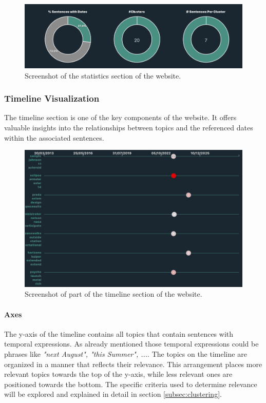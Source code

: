\documentclass[12pt,oneside,bibtotoc,liststotoc]{scrbook}
\begin{document}
\begin{figure}[H]
\centering
\includegraphics[width=13cm]{img/statistics.png}
\caption{Screenshot of the statistics section of the website.}
\label{fig:statistics_website}
\end{figure}


\subsubsection{Timeline Visualization}
 The timeline section is one of the key components of the website. It offers valuable insights into the relationships between topics and the referenced dates within the associated sentences.

\begin{figure}[H]
\centering
\includegraphics[width=13cm]{img/timeline.png}
\caption{Screenshot of part of the timeline section of the website.}
\label{fig:timeline_website}
\end{figure}

\paragraph{Axes}
The y-axis of the timeline contains all topics that contain sentences with temporal expressions. As already mentioned those temporal expressions could be phrases like \textit{"next August", "this Summer", ...}. The topics on the timeline are organized in a manner that reflects their relevance. This arrangement places more relevant topics towards the top of the y-axis, while less relevant ones are positioned towards the bottom. The specific criteria used to determine relevance will be explored and explained in detail in section \ref{subsec:clustering}.
\end{document}
